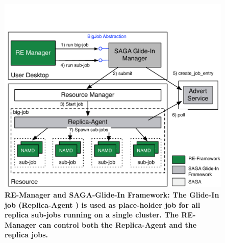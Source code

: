 \documentclass{rspublic}
\newcommand{\replicaagent}[1]{Replica-Agent }
\newcommand{\remanager}[1]{RE-Manager }
\begin{document}
\begin{figure}[t]
\begin{minipage}[t]{.51\textwidth}
\begin{center}
      \includegraphics[width=\textwidth]{re_bigjob_interactions_v2}
      \caption{\footnotesize \bf RE-Manager and SAGA-Glide-In Framework:
        The Glide-In job (\replicaagent\ ) is used as place-holder job
        for all replica sub-jobs running on a single cluster. The
        \remanager\ can control both the \replicaagent\ and the replica
        jobs.}
        \label{fig:remdmanager_v1.1}   
    \end{center}
  \end{minipage}
  \hfill
\end{figure}



    

\end{document}
